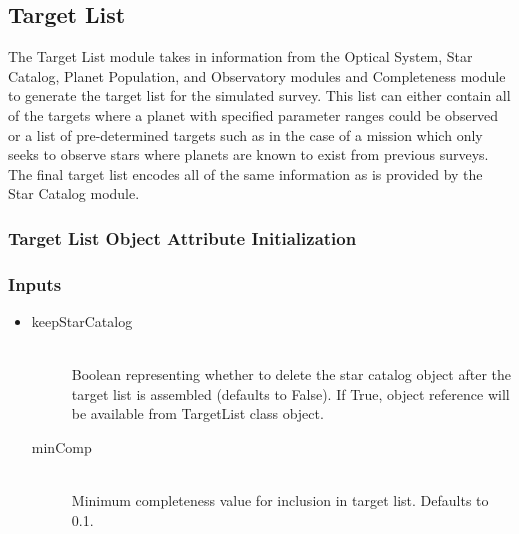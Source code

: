 \documentclass[cleanfoot]{asme2ej}
\begin{document}

\subsection{Target List}
The Target List module takes in information from the Optical System, Star Catalog, Planet Population, and Observatory modules and Completeness module to generate the target list for the simulated survey.  This list can either contain all of the targets where a planet with specified parameter ranges could be observed or a list of pre-determined targets such as in the case of a mission which only seeks to observe stars where planets are known to exist from previous surveys.  The final target list encodes all of the same information as is provided by the Star Catalog module.

\label{sec:targetlist}
\subsubsection{Target List Object Attribute Initialization}
\subsubsection*{Inputs}
\begin{itemize}
    \item 
    \begin{description}
        \item[keepStarCatalog] \hfill \\
        Boolean representing whether to delete the star catalog object after the target list is assembled (defaults to False).  If True, object reference will be available from TargetList class object.
        \item[minComp] \hfill \\
        Minimum completeness value for inclusion in target list.  Defaults to 0.1.
    \end{description}
\end{itemize}
\end{document}
